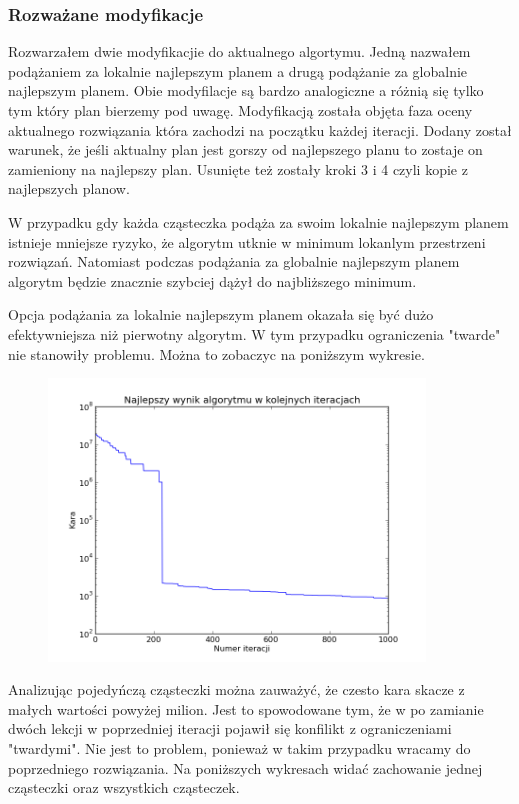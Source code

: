 \subsubsection{Rozważane modyfikacje}
\par Rozwarzałem dwie modyfikacjie do aktualnego algortymu. Jedną nazwałem podążaniem za lokalnie najlepszym planem a drugą podążanie za globalnie najlepszym planem. Obie modyfilacje są bardzo analogiczne a różnią się tylko tym który plan bierzemy pod uwagę. Modyfikacją została objęta faza oceny aktualnego rozwiązania która zachodzi na początku każdej iteracji. Dodany został warunek, że jeśli aktualny plan jest gorszy od najlepszego planu to zostaje on zamieniony na najlepszy plan.  Usunięte też zostały kroki 3 i 4 czyli kopie z najlepszych planow.
\par W przypadku gdy każda cząsteczka podąża za swoim lokalnie najlepszym planem istnieje mniejsze ryzyko, że algorytm utknie w minimum lokanlym przestrzeni rozwiązań. Natomiast podczas podążania za globalnie najlepszym planem algorytm będzie znacznie szybciej dążył do najbliższego minimum.
\par Opcja podążania za lokalnie najlepszym planem okazała się być dużo efektywniejsza niż pierwotny algorytm. W tym przypadku ograniczenia "twarde" nie stanowiły problemu. Można to zobaczyc na poniższym wykresie.
\begin{figure}[H]
\includegraphics[width=10cm]{img/localbest_penalty.png}
\centering
\end{figure}
\par Analizując pojedyńczą cząsteczki można zauważyć, że czesto kara skacze z małych wartości powyżej milion. Jest to spowodowane tym, że w po zamianie dwóch lekcji w poprzedniej iteracji pojawił się konfilikt z ograniczeniami "twardymi". Nie jest to problem, ponieważ w takim przypadku wracamy do poprzedniego rozwiązania. Na poniższych wykresach widać zachowanie jednej cząsteczki oraz wszystkich cząsteczek.
